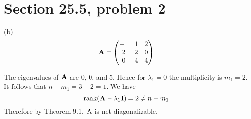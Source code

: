 \section{Section 25.5, problem 2}
(b)
$${\bf A}=\left(\begin{matrix}
-1 & 1 & 2\cr
2 & 2 & 0\cr
0 & 4 & 4
\end{matrix}\right)
$$

\bigskip
\noindent
The eigenvalues of $\bf A$ are 0, 0, and 5.
Hence for $\lambda_1=0$ the multiplicity is $m_1=2$.
It follows that $n-m_1=3-2=1$.
We have
$$\mathop{\rm rank}({\bf A}-\lambda_1{\bf I})=2\ne n-m_1$$
Therefore by Theorem 9.1, $\bf A$ is not diagonalizable.
